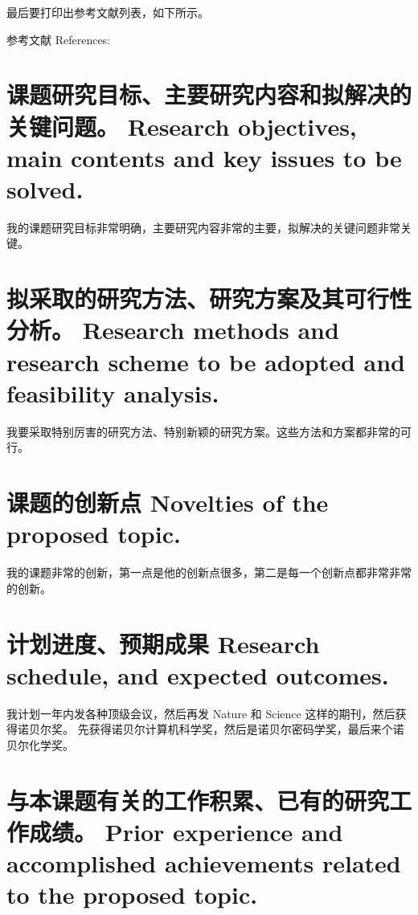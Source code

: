 \documentclass[a4paper,zihao=-4,AutoFakeBold]{ctexart}
\begin{document}
最后要打印出参考文献列表，如下所示。


\vspace{2\baselineskip}%
{%
    \linespread{1.25}\selectfont    %
    参考文献 References: 
    \printbibliography[heading=none]
}


\section{课题研究目标、主要研究内容和拟解决的关键问题。 
    Research objectives, main contents and key issues to be solved.}

我的课题研究目标非常明确，主要研究内容非常的主要，拟解决的关键问题非常关键。



\section{拟采取的研究方法、研究方案及其可行性分析。
    Research methods and research scheme to be adopted 
    and feasibility analysis.}

我要采取特别厉害的研究方法、特别新颖的研究方案。这些方法和方案都非常的可行。



\section{课题的创新点 Novelties of the proposed topic.}

我的课题非常的创新，第一点是他的创新点很多，第二是每一个创新点都非常非常的创新。



\section{计划进度、预期成果 Research schedule, and expected outcomes.}

我计划一年内发各种顶级会议，然后再发 Nature 和 Science 这样的期刊，然后获得诺贝尔奖。
先获得诺贝尔计算机科学奖，然后是诺贝尔密码学奖，最后来个诺贝尔化学奖。



\section{与本课题有关的工作积累、已有的研究工作成绩。
    Prior experience and accomplished achievements 
    related to the proposed topic.}
\end{document}
